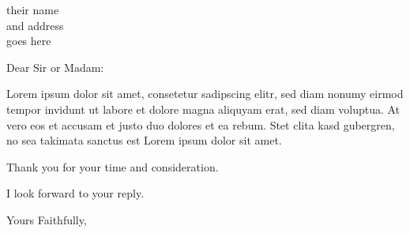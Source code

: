 \documentclass{letter}
\begin{document}
\begin{letter}{their name \\ and address \\ goes here}
\opening{Dear Sir or Madam:}

Lorem ipsum dolor sit amet, consetetur sadipscing elitr, sed diam nonumy eirmod
tempor invidunt ut labore et dolore magna aliquyam erat, sed diam voluptua. At
vero eos et accusam et justo duo dolores et ea rebum. Stet clita kasd
gubergren, no sea takimata sanctus est Lorem ipsum dolor sit amet.


Thank you for your time and consideration.

I look forward to your reply.

\closing{Yours Faithfully,}




\end{letter}
\end{document}
